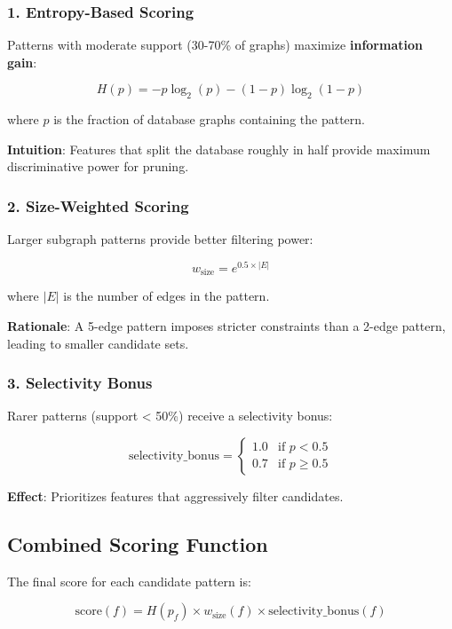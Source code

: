 \documentclass[12pt,a4paper]{article}
\begin{document}
\subsubsection{1. Entropy-Based Scoring}

Patterns with moderate support (30-70\% of graphs) maximize \textbf{information gain}:

\[
H(p) = -p \log_2(p) - (1-p) \log_2(1-p)
\]

where $p$ is the fraction of database graphs containing the pattern.

\textbf{Intuition}: Features that split the database roughly in half provide maximum discriminative power for pruning.

\subsubsection{2. Size-Weighted Scoring}

Larger subgraph patterns provide better filtering power:

\[
w_{\text{size}} = e^{0.5 \times |E|}
\]

where $|E|$ is the number of edges in the pattern.

\textbf{Rationale}: A 5-edge pattern imposes stricter constraints than a 2-edge pattern, leading to smaller candidate sets.

\subsubsection{3. Selectivity Bonus}

Rarer patterns (support < 50\%) receive a selectivity bonus:

\[
\text{selectivity\_bonus} = 
\begin{cases}
1.0 & \text{if } p < 0.5 \\
0.7 & \text{if } p \geq 0.5
\end{cases}
\]

\textbf{Effect}: Prioritizes features that aggressively filter candidates.

\subsection{Combined Scoring Function}

The final score for each candidate pattern is:

\[
\text{score}(f) = H(p_f) \times w_{\text{size}}(f) \times \text{selectivity\_bonus}(f)
\]
\end{document}
